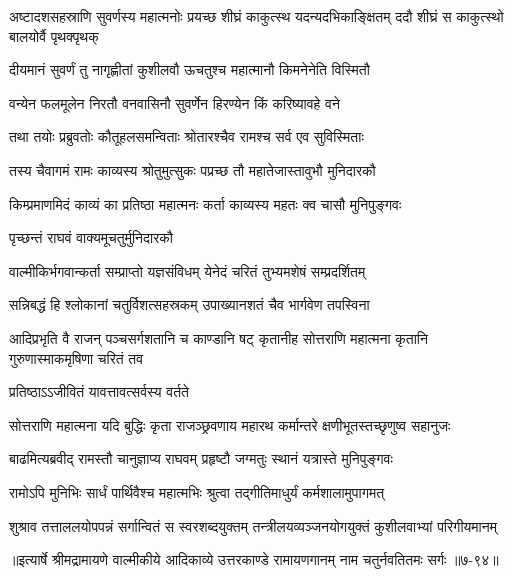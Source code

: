 \threelineshloka
{अष्टादशसहस्राणि सुवर्णस्य महात्मनोः}
{प्रयच्छ शीघ्रं काकुत्स्थ यदन्यदभिकाङ्क्षितम्}
{ददौ शीघ्रं स काकुत्स्थो बालयोर्वै पृथक्पृथक्} %

\twolineshloka
{दीयमानं सुवर्णं तु नागृह्णीतां कुशीलवौ}
{ऊचतुश्च महात्मानौ किमनेनेति विस्मितौ} %

\twolineshloka
{वन्येन फलमूलेन निरतौ वनवासिनौ}
{सुवर्णेन हिरण्येन किं करिष्यावहे वने} %

\twolineshloka
{तथा तयोः प्रब्रुवतोः कौतूहलसमन्विताः}
{श्रोतारश्चैव रामश्च सर्व एव सुविस्मिताः} %

\twolineshloka
{तस्य चैवागमं रामः काव्यस्य श्रोतुमुत्सुकः}
{पप्रच्छ तौ महातेजास्तावुभौ मुनिदारकौ} %

\twolineshloka
{किम्प्रमाणमिदं काव्यं का प्रतिष्ठा महात्मनः}
{कर्ता काव्यस्य महतः क्व चासौ मुनिपुङ्गवः} %

\onelineshloka
{पृच्छन्तं राघवं वाक्यमूचतुर्मुनिदारकौ} %

\twolineshloka
{वाल्मीकिर्भगवान्कर्ता सम्प्राप्तो यज्ञसंविधम्}
{येनेदं चरितं तुभ्यमशेषं सम्प्रदर्शितम्} %

\twolineshloka
{सन्निबद्धं हि श्लोकानां चतुर्विशत्सहस्रकम्}
{उपाख्यानशतं चैव भार्गवेण तपस्विना} %

\threelineshloka
{आदिप्रभृति वै राजन् पञ्चसर्गशतानि च}
{काण्डानि षट् कृतानीह सोत्तराणि महात्मना}
{कृतानि गुरुणास्माकमृषिणा चरितं तव} %

\onelineshloka
{प्रतिष्ठाऽऽजीवितं यावत्तावत्सर्वस्य वर्तते} %

\threelineshloka
{सोत्तराणि महात्मना}
{यदि बुद्धिः कृता राजञ्छ्रवणाय महारथ}
{कर्मान्तरे क्षणीभूतस्तच्छृणुष्व सहानुजः} %

\twolineshloka
{बाढमित्यब्रवीद् रामस्तौ चानुज्ञाप्य राघवम्}
{प्रहृष्टौ जग्मतुः स्थानं यत्रास्ते मुनिपुङ्गवः} %

\twolineshloka
{रामोऽपि मुनिभिः सार्धं पार्थिवैश्च महात्मभिः}
{श्रुत्वा तद्गीतिमाधुर्यं कर्मशालामुपागमत्} %

\twolineshloka
{शुश्राव तत्ताललयोपपन्नं सर्गान्वितं स स्वरशब्दयुक्तम्}
{तन्त्रीलयव्यञ्जनयोगयुक्तं कुशीलवाभ्यां परिगीयमानम्} %


॥इत्यार्षे श्रीमद्रामायणे वाल्मीकीये आदिकाव्ये उत्तरकाण्डे रामायणगानम् नाम चतुर्नवतितमः सर्गः ॥७-९४॥

